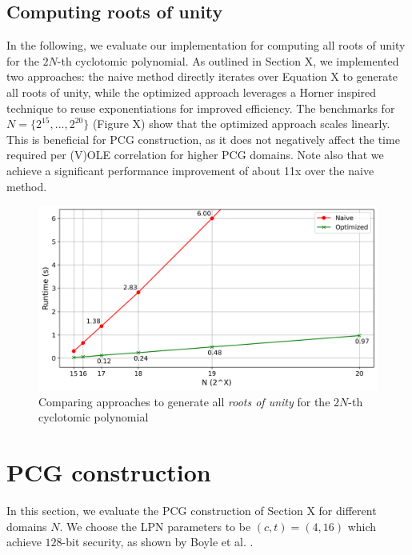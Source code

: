 \subsection{Computing roots of unity}
In the following, we evaluate our implementation for computing all roots of unity for the $2N$-th cyclotomic polynomial. As outlined in Section X, we implemented two approaches: the naive method directly iterates over Equation X to generate all roots of unity, while the optimized approach leverages a Horner inspired technique to reuse exponentiations for improved efficiency. The benchmarks for $N=\{2^{15}, ..., 2^{20}\}$ (Figure X) show that the optimized approach scales linearly. This is beneficial for PCG construction, as it does not negatively affect the time required per (V)OLE correlation for higher PCG domains. Note also that we achieve a significant performance improvement of about 11x over the naive method.

\begin{figure}[h!]
    \centering
    \includegraphics[scale=0.49]{images/plots/gen_roots.png}
    \caption{Comparing approaches to generate all \textit{roots of unity} for the $2N$-th cyclotomic polynomial}
\end{figure}


\section{PCG construction}
In this section, we evaluate the PCG construction of Section X for different domains $N$. We choose the LPN parameters to be $(c,t)=(4,16)$ which achieve $128$-bit security, as shown by Boyle et al. \cite{boyle2020efficient}. 

